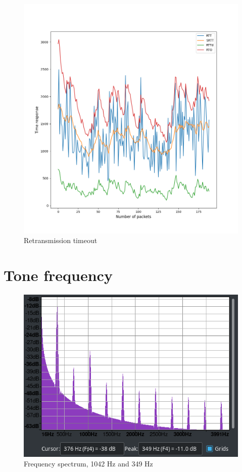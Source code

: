 \documentclass[hidelinks, 12pt, a4paper]{article}
\begin{document}
\begin{figure}[h!]
\centering
	\includegraphics[height=.38\textheight, width=\textwidth]{assets/session2/r1.png}
	\caption{Retransmission timeout} 
\end{figure}

\section{Tone frequency}

\begin{figure}[h!]
\centering
	\includegraphics[height=.37\textheight, width=\textwidth]{assets/session2/spectrum.png}
    \caption{Frequency spectrum, 1042 Hz and 349 Hz}
\end{figure}
\end{document}
